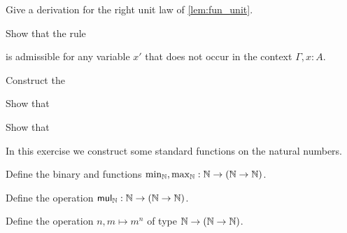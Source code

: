 \begin{exercises}
\item \label{ex:fun_right_unit}Give a derivation for the right unit law of \autoref{lem:fun_unit}.
\item Show that the rule
\begin{prooftree}
\end{prooftree}
is admissible for any variable $x'$ that does not occur in the context $\Gamma,x:A$.
\item 
  \begin{subexenum}
  \item Construct the 
    \begin{prooftree}
    \end{prooftree}
  \item Show that
    \begin{prooftree}
    \end{prooftree}
  \item Show that
    \begin{prooftree}
    \end{prooftree}
  \end{subexenum}
\item In this exercise we construct some standard functions on the natural numbers.
  \begin{subexenum}
  \item Define the binary  and  functions $\min_\N,\max_\N:\N\to(\N\to\N)$.
  \item Define the  operation $\mathsf{mul}_\N :\N\to(\N\to\N)$.
  \item Define the  operation $n,m\mapsto m^n$ of type $\N\to (\N\to \N)$.

\end{subexenum}
\end{exercises}
